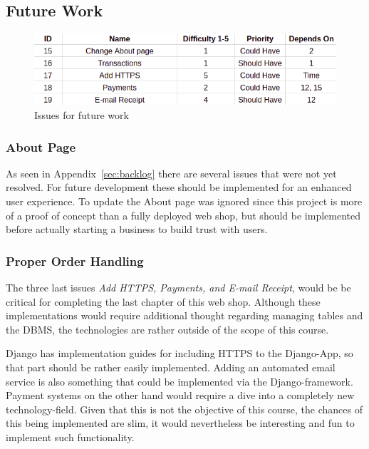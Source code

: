 \subsection{Future Work} 

\begin{figure}[H]
\centering
\includegraphics[width=\textwidth]{third_sprint/other.png}
\caption{\label{fig:sprint_4} Issues for future work}
\end{figure}

\subsubsection{About Page}\label{sec:about}

As seen in Appendix~\ref{sec:backlog} there are several issues that were
not yet resolved. For future development these should be implemented for
an enhanced user experience. To update the About page was ignored since
this project is more of a proof of concept than a fully deployed web shop, but
should be implemented before actually starting a business to build trust with
users.



\subsubsection{Proper Order Handling}\label{sec:security}

The three last issues \textit{Add HTTPS, Payments, and E-mail Receipt}, would
be be critical for completing the last chapter of this web shop. Although these
implementations would require additional thought regarding managing tables
and the DBMS, the technologies are rather outside of the scope of this course.

Django has implementation guides for including HTTPS to the Django-App,
so that part should be rather easily implemented. Adding an automated email
service is also something that could be implemented via the Django-framework.
Payment systems on the other hand would require a dive into a completely
new technology-field. Given that this is not the objective of this course,
the chances of this being implemented are slim, it would nevertheless be
interesting and fun to implement such functionality.
